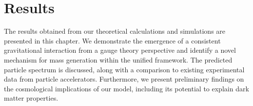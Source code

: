 \chapter{Results}
\label{chap:results}
The results obtained from our theoretical calculations and simulations are presented in this chapter. We demonstrate the emergence of a consistent gravitational interaction from a gauge theory perspective and identify a novel mechanism for mass generation within the unified framework. The predicted particle spectrum is discussed, along with a comparison to existing experimental data from particle accelerators. Furthermore, we present preliminary findings on the cosmological implications of our model, including its potential to explain dark matter properties.
\blindtext[3] %
